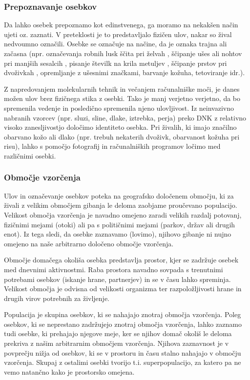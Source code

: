 \subsubsection{Prepoznavanje osebkov}
Da lahko osebek prepoznamo kot edinstvenega, ga moramo na nekakšen način ujeti oz. zaznati. V preteklosti je to predstavljalo fizičen ulov, nakar so žival nedvoumno označili. Osebke se označuje na načine, da je oznaka trajna ali začasna (npr. označevanja robnih lusk ščita pri želvah \citep{pike2005}, ščipanje ušes ali nohtov pri manjših sesalcih \citep{wiewel_assessing_2007}, pisanje številk na krila metuljev \citep{jugovic_movement_2017}, ščipanje prstov pri dvoživkah \citep{campbell_evaluation_2009}, opremljanje z ušesnimi značkami, barvanje kožuha, tetoviranje idr.).

Z napredovanjem molekularnih tehnik in večanjem računalniške moči, je danes možen ulov brez fizičnega stika z osebki. Tako je manj verjetno verjetno, da bo spremenila vedenje in posledično spremenila njeno ulovljivost.
Iz neinvazivno nabranih vzorcev (npr. sluzi, sline, dlake, iztrebka, perja) preko DNK z relativno visoko zanesljivostjo določimo identiteto osebka. Pri živalih, ki imajo značilno obarvano kožo ali dlako (npr. trebuh nekaterih dvoživk, obarvanost kožuha pri risu), lahko s pomočjo fotografij in računalniških programov ločimo med različnimi osebki.

\subsubsection{Območje vzorčenja}
Ulov in označevanje osebkov poteka na geografsko določenem območju, ki za živali z velikim območjem gibanja le deloma zaobjame proučevano populacijo. Velikost območja vzorčenja je navadno omejeno zaradi velikih razdalj potovanj, fizičnimi mejami (otoki) ali pa s političnimi mejami (parkov, držav ali drugih enot). Iz tega sledi, da osebke zaznavamo (lovimo), njihovo gibanje ni nujno omejeno na naše arbitrarno določeno območje vzorčenja.

Območje domačega okoliša osebka predstavlja prostor, kjer se zadržuje osebek med dnevnimi aktivnostmi. Raba prostora navadno sovpada s trenutnimi potrebami osebkov (iskanje hrane, partnerjev) in se v času lahko spreminja. Velikost območja je odvisna od velikosti organizma ter razpoložljivosti hrane in drugih virov potrebnih za življenje.

Populacija je skupina osebkov, ki se nahajajo znotraj območja vzorčenja. Poleg osebkov, ki se neprestano zadržujejo znotraj območja vzorčenja, lahko zaznamo tudi osebke, ki prehajajo njegove meje, ker se njihov domač okoliš le deloma prekriva z našim arbitrarnim območjem vzorčenja. Njihova zaznavnost je v povprečju nižja od osebkov, ki se v prostoru in času stalno nahajajo v območju vzorčenja. Skupaj z ostalimi osebki tvorijo t.i. superpopulacijo, za katero pa ne vemo natančno kako je prostorsko omejena.


